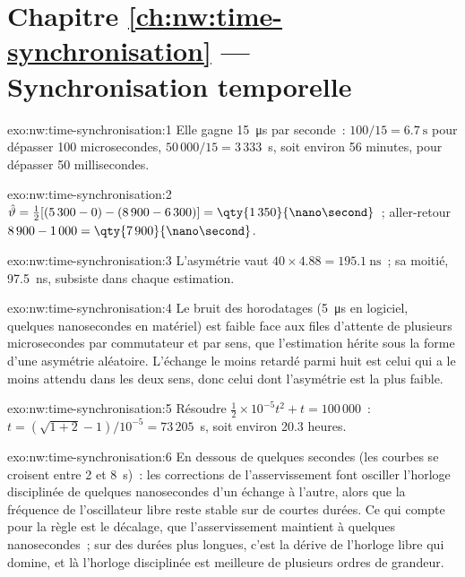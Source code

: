 \section*{Chapitre \ref{ch:nw:time-synchronisation} --- Synchronisation temporelle}

\begin{solution}{exo:nw:time-synchronisation:1}
Elle gagne \qty{15}{\micro\second} par seconde~: $100/15 = \qty{6.7}{\second}$ pour dépasser 100 microsecondes, $50\,000/15 = 3\,333$~s, soit environ 56
minutes, pour dépasser 50 millisecondes.
\end{solution}

\begin{solution}{exo:nw:time-synchronisation:2}
$\hat\vartheta = \tfrac12[(5\,300 - 0) - (8\,900 - 6\,300)] = \qty{1\,350}{\nano\second}$~; aller-retour $8\,900 - 1\,000 =
\qty{7\,900}{\nano\second}$.
\end{solution}

\begin{solution}{exo:nw:time-synchronisation:3}
L'asymétrie vaut $40 \times 4.88 = \qty{195.1}{\nano\second}$~; sa moitié, \qty{97.5}{\nano\second}, subsiste dans chaque estimation.
\end{solution}

\begin{solution}{exo:nw:time-synchronisation:4}
Le bruit des horodatages (\qty{5}{\micro\second} en logiciel, quelques nanosecondes en matériel) est faible face aux files d'attente de
plusieurs microsecondes par commutateur et par sens, que l'estimation hérite sous la forme d'une asymétrie aléatoire. L'échange le moins retardé parmi huit est
celui qui a le moins attendu dans les deux sens, donc celui dont l'asymétrie est la plus faible.
\end{solution}

\begin{solution}{exo:nw:time-synchronisation:5}
Résoudre $\tfrac12 \times 10^{-5} t^2 + t = 100\,000$~: $t = (\sqrt{1 + 2} - 1)/10^{-5} = 73\,205$~s, soit environ 20.3 heures.
\end{solution}

\begin{solution}{exo:nw:time-synchronisation:6}
En dessous de quelques secondes (les courbes se croisent entre 2 et 8~s)~: les corrections de l'asservissement font osciller l'horloge disciplinée de quelques nanosecondes d'un échange à l'autre, alors que la fréquence
de l'oscillateur libre reste stable sur de courtes durées. Ce qui compte pour la règle est le décalage, que l'asservissement maintient à quelques nanosecondes~; sur
des durées plus longues, c'est la dérive de l'horloge libre qui domine, et là l'horloge disciplinée est meilleure de plusieurs ordres de grandeur.
\end{solution}


